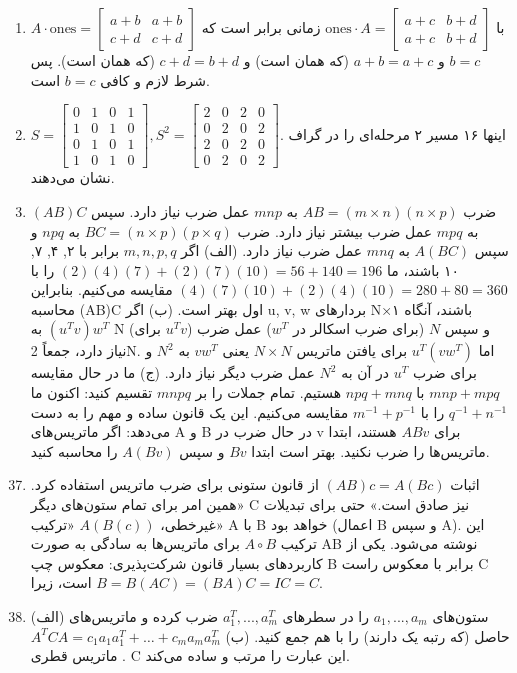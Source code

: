 \documentclass[12pt,a4paper]{article}
\begin{document}
{\begin{enumerate}
			\item $A \cdot \text{ones} = \begin{bmatrix} a+b & a+b \\ c+d & c+d \end{bmatrix}$ با $\text{ones} \cdot A = \begin{bmatrix} a+c & b+d \\ a+c & b+d \end{bmatrix}$ زمانی برابر است که $b=c$ و $a+b=a+c$ (که همان است) و $c+d=b+d$ (که همان است). پس شرط لازم و کافی $b=c$ است.
			
			\item $S= \begin{bmatrix} 0 & 1 & 0 & 1 \\ 1 & 0 & 1 & 0 \\ 0 & 1 & 0 & 1 \\ 1 & 0 & 1 & 0 \end{bmatrix} , S^2= \begin{bmatrix} 2 & 0 & 2 & 0 \\ 0 & 2 & 0 & 2 \\ 2 & 0 & 2 & 0 \\ 0 & 2 & 0 & 2 \end{bmatrix}$. اینها ۱۶ مسیر ۲ مرحله‌ای را در گراف نشان می‌دهند.
			
			\item ضرب $AB = (m \times n)(n \times p)$ به $mnp$ عمل ضرب نیاز دارد. سپس $(AB)C$ به $mpq$ عمل ضرب بیشتر نیاز دارد. ضرب $BC = (n \times p)(p \times q)$ به $npq$ و سپس $A(BC)$ به $mnq$ عمل ضرب نیاز دارد.
			(الف) اگر $m, n, p, q$ برابر با ۲, ۴, ۷, ۱۰ باشند، ما $(2)(4)(7) + (2)(7)(10) = 56 + 140 = 196$ را با $(4)(7)(10) + (2)(4)(10) = 280 + 80 = 360$ مقایسه می‌کنیم. بنابراین محاسبه (AB)C اول بهتر است.
			(ب) اگر u, v, w بردارهای N×۱ باشند، آنگاه $(u^Tv)w^T$ به N (برای $u^Tv$) و سپس $N$ (برای ضرب اسکالر در $w^T$) عمل ضرب نیاز دارد، جمعاً 2N. اما $u^T(vw^T)$ برای یافتن ماتریس $N \times N$ یعنی $vw^T$ به $N^2$ و برای ضرب $u^T$ در آن به $N^2$ عمل ضرب دیگر نیاز دارد.
			(ج) ما در حال مقایسه $mnp+mpq$ با $npq+mnq$ هستیم. تمام جملات را بر $mnpq$ تقسیم کنید: اکنون ما $q^{-1}+n^{-1}$ را با $m^{-1}+p^{-1}$ مقایسه می‌کنیم. این یک قانون ساده و مهم را به دست می‌دهد: اگر ماتریس‌های A و B در حال ضرب در v برای $ABv$ هستند، ابتدا ماتریس‌ها را ضرب نکنید. بهتر است ابتدا $Bv$ و سپس $A(Bv)$ را محاسبه کنید.
		\end{enumerate}
		
	
		\begin{enumerate}
			\setcounter{enumi}{36}
			\item اثبات $(AB)c = A(Bc)$ از قانون ستونی برای ضرب ماتریس استفاده کرد. «همین امر برای تمام ستون‌های دیگر C نیز صادق است.»
			حتی برای تبدیلات غیرخطی، $A(B(c))$ «ترکیب» A با B خواهد بود (اعمال B و سپس A). این ترکیب $A \circ B$ برای ماتریس‌ها به سادگی به صورت AB نوشته می‌شود.
			یکی از کاربردهای بسیار قانون شرکت‌پذیری: معکوس چپ B برابر با معکوس راست C است، زیرا $B = B(AC) = (BA)C = IC = C$.
			
			\item (الف) ستون‌های $a_1, ..., a_m$ را در سطرهای $a_1^T, ..., a_m^T$ ضرب کرده و ماتریس‌های حاصل (که رتبه یک دارند) را با هم جمع کنید.
			(ب) $A^TCA = c_1a_1a_1^T + \dots + c_ma_ma_m^T$. ماتریس قطری C این عبارت را مرتب و ساده می‌کند.
		\end{enumerate}
		
	}
\end{document}
